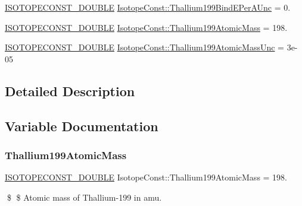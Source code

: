 \begin{DoxyCompactItemize}
\mbox{\hyperlink{group___isotope_const-_macros_ga8f45a7272ce02c0b4c65c44636ed719a}{I\+S\+O\+T\+O\+P\+E\+C\+O\+N\+S\+T\+\_\+\+D\+O\+U\+B\+LE}} \mbox{\hyperlink{group___isotope_const-_thallium-_tl199_ga7a660068f324c88d2999e72809e1b4a6}{Isotope\+Const\+::\+Thallium199\+Bind\+E\+Per\+A\+Unc}} = 0.
\item 
\mbox{\hyperlink{group___isotope_const-_macros_ga8f45a7272ce02c0b4c65c44636ed719a}{I\+S\+O\+T\+O\+P\+E\+C\+O\+N\+S\+T\+\_\+\+D\+O\+U\+B\+LE}} \mbox{\hyperlink{group___isotope_const-_thallium-_tl199_gadc02cb45a8d7f09eb85403dd65ba0a7c}{Isotope\+Const\+::\+Thallium199\+Atomic\+Mass}} = 198.
\item 
\mbox{\hyperlink{group___isotope_const-_macros_ga8f45a7272ce02c0b4c65c44636ed719a}{I\+S\+O\+T\+O\+P\+E\+C\+O\+N\+S\+T\+\_\+\+D\+O\+U\+B\+LE}} \mbox{\hyperlink{group___isotope_const-_thallium-_tl199_ga83c67267cbb36a8356026326d4e1755f}{Isotope\+Const\+::\+Thallium199\+Atomic\+Mass\+Unc}} = 3e-\/05
\end{DoxyCompactItemize}


\subsection{Detailed Description}


\subsection{Variable Documentation}
\mbox{\label{group___isotope_const-_thallium-_tl199_gadc02cb45a8d7f09eb85403dd65ba0a7c}} 
\subsubsection{\texorpdfstring{Thallium199\+Atomic\+Mass}{Thallium199AtomicMass}}
{\footnotesize\ttfamily \mbox{\hyperlink{group___isotope_const-_macros_ga8f45a7272ce02c0b4c65c44636ed719a}{I\+S\+O\+T\+O\+P\+E\+C\+O\+N\+S\+T\+\_\+\+D\+O\+U\+B\+LE}} Isotope\+Const\+::\+Thallium199\+Atomic\+Mass = 198.}

\$ \$ Atomic mass of Thallium-\/199 in amu. \mbox{\label{group___isotope_const-_thallium-_tl199_ga83c67267cbb36a8356026326d4e1755f}} 
